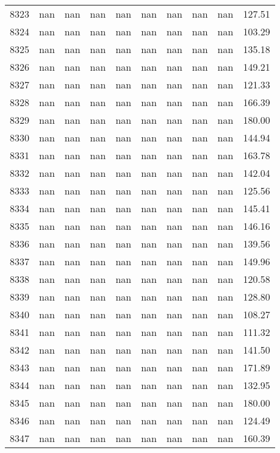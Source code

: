 \begin{tabular}{lrrrrrrrrr}
8323 & nan & nan & nan & nan & nan & nan & nan & nan & 127.51 \\
8324 & nan & nan & nan & nan & nan & nan & nan & nan & 103.29 \\
8325 & nan & nan & nan & nan & nan & nan & nan & nan & 135.18 \\
8326 & nan & nan & nan & nan & nan & nan & nan & nan & 149.21 \\
8327 & nan & nan & nan & nan & nan & nan & nan & nan & 121.33 \\
8328 & nan & nan & nan & nan & nan & nan & nan & nan & 166.39 \\
8329 & nan & nan & nan & nan & nan & nan & nan & nan & 180.00 \\
8330 & nan & nan & nan & nan & nan & nan & nan & nan & 144.94 \\
8331 & nan & nan & nan & nan & nan & nan & nan & nan & 163.78 \\
8332 & nan & nan & nan & nan & nan & nan & nan & nan & 142.04 \\
8333 & nan & nan & nan & nan & nan & nan & nan & nan & 125.56 \\
8334 & nan & nan & nan & nan & nan & nan & nan & nan & 145.41 \\
8335 & nan & nan & nan & nan & nan & nan & nan & nan & 146.16 \\
8336 & nan & nan & nan & nan & nan & nan & nan & nan & 139.56 \\
8337 & nan & nan & nan & nan & nan & nan & nan & nan & 149.96 \\
8338 & nan & nan & nan & nan & nan & nan & nan & nan & 120.58 \\
8339 & nan & nan & nan & nan & nan & nan & nan & nan & 128.80 \\
8340 & nan & nan & nan & nan & nan & nan & nan & nan & 108.27 \\
8341 & nan & nan & nan & nan & nan & nan & nan & nan & 111.32 \\
8342 & nan & nan & nan & nan & nan & nan & nan & nan & 141.50 \\
8343 & nan & nan & nan & nan & nan & nan & nan & nan & 171.89 \\
8344 & nan & nan & nan & nan & nan & nan & nan & nan & 132.95 \\
8345 & nan & nan & nan & nan & nan & nan & nan & nan & 180.00 \\
8346 & nan & nan & nan & nan & nan & nan & nan & nan & 124.49 \\
8347 & nan & nan & nan & nan & nan & nan & nan & nan & 160.39 \\

\end{tabular}
